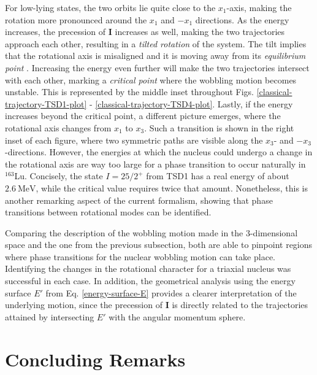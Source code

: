 For low-lying states, the two orbits lie quite close to the $x_1$-axis, making the rotation more pronounced around the $x_1$ and $-x_1$ directions. As the energy increases, the precession of $\mathbf{I}$ increases as well, making the two trajectories approach each other, resulting in a \emph{tilted rotation} of the system. The tilt implies that the rotational axis is misaligned and it is moving away from its \emph{equilibrium point} \cite{poenaru2021extensive2}. Increasing the energy even further will make the two trajectories intersect with each other, marking a \emph{critical point} where the wobbling motion becomes unstable. This is represented by the middle inset throughout Figs. \ref{classical-trajectory-TSD1-plot} - \ref{classical-trajectory-TSD4-plot}. Lastly, if the energy increases beyond the critical point, a different picture emerges, where the rotational axis changes from $x_1$ to $x_3$. Such a transition is shown in the right inset of each figure, where two symmetric paths are visible along the $x_3$- and $-x_3$-directions. However, the energies at which the nucleus could undergo a change in the rotational axis are way too large for a phase transition to occur naturally in $^{163}$Lu. Concisely, the state $I=25/2^+$ from TSD1 has a real energy of about $2.6\ \text{MeV}$, while the critical value requires twice that amount. Nonetheless, this is another remarking aspect of the current formalism, showing that phase transitions between rotational modes can be identified.

Comparing the description of the wobbling motion made in the 3-dimensional space and the one from the previous subsection, both are able to pinpoint regions where phase transitions for the nuclear wobbling motion can take place. Identifying the changes in the rotational character for a triaxial nucleus was successful in each case. In addition, the geometrical analysis using the energy surface $E'$ from Eq. \ref{energy-surface-E} provides a clearer interpretation of the underlying motion, since the precession of $\mathbf{I}$ is directly related to the trajectories attained by intersecting $E'$ with the angular momentum sphere.

\section{Concluding Remarks}

